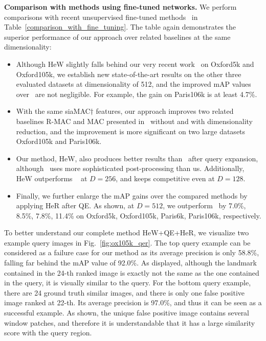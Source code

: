 \documentclass[journal]{IEEEtran}
\begin{document}
\vspace{0.01in}
\textbf{Comparison with methods using  fine-tuned networks.}
We perform comparisons with recent unsupervised fine-tuned methods~\cite{arandjelovic2016netvlad,radenovic2016cnn,hoang2017selective,ong2017siamese,pang2018building} in Table~\ref{comparison_with_fine_tuning}.
The table again demonstrates the superior performance of our approach over related baselines at the same dimensionality:
\begin{itemize}
  \item Although HeW slightly falls behind our very recent work~\cite{pang2018building} on Oxford5k and Oxford105k, we establish new state-of-the-art results on the other three evaluated datasets at dimensionality of 512, and the improved mAP values over~\cite{arandjelovic2016netvlad,radenovic2016cnn,hoang2017selective,ong2017siamese} are
      not negligible. For example, the gain on Paris106k is at least 4.7\%.
  \item With the same siaMAC$\dagger$ features, our approach improves two related baselines R-MAC and MAC presented in~\cite{radenovic2016cnn} without and with dimensionality reduction, and the improvement is more significant on two large datasets Oxford105k and Paris106k.
  \item Our method, HeW, also produces better results than~\cite{radenovic2016cnn} after query expansion,
  although~\cite{radenovic2016cnn} uses more sophisticated post-processing than us.
  Additionally, HeW outperforms ~\cite{radenovic2016cnn} at $D=256$, and keeps competitive even at $D=128$.
  \item Finally, we further enlarge the mAP gains over the compared methods by applying HeR after QE. As shown, at  $D=512$,
  we outperform~\cite{radenovic2016cnn} by 7.0\%, 8.5\%, 7.8\%, 11.4\% on Oxford5k, Oxford105k, Paris6k, Paris106k, respectively.
\end{itemize}


To better understand our complete method HeW+QE+HeR, we visualize two example query images in Fig.~\ref{fig:ox105k_qer}.
The top query example can be considered as a failure case for our method as its average precision is only 58.8\%, falling far behind the mAP value of 92.0\%. As displayed, although the landmark contained in the 24-th ranked image is exactly not the same as the one contained in the query, it is visually similar to the query.
For the bottom query example, there are 24 ground truth similar images, and there is only one false positive image ranked at 22-th.
Its average precision is 97.0\%, and thus it can be seen as a successful example.
As shown, the unique false positive image contains several window patches, and therefore it is understandable that it has a large similarity score with the query region.
\end{document}
